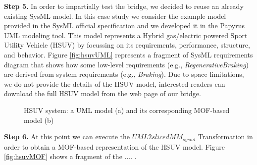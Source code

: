 \textbf{Step 5.} In order to impartially test the bridge, we decided to reuse an already existing SysML model. 
In this case study we consider the example model provided in the SysML official specification and we developed it in the Papyrus UML modeling tool.
This model represents a Hybrid gas/electric powered Sport Utility Vehicle (HSUV) by focussing on its requirements, performance, structure, and behavior. Figure \ref{fig:hsuvUML} represents a fragment of SysML requirements diagram that shows how some low-level requirements
(e.g., \textit{RegenerativeBraking})
are derived from system requirements (e.g., \textit{Braking}). Due to space limitations, we do not provide the details of the HSUV model, interested readers can download the full HSUV model from the web page of our bridge. 

\begin{figure}
  \centering
 \hspace{2mm}
  \caption{HSUV system: a UML model (a) and its corresponding MOF-based model (b)}
  \label{fig:hsuv}
\end{figure}
%
\textbf{Step 6.} At this point we can execute the $UML2slicedMM_{sysml}$ Transformation in order to obtain a MOF-based representation
of the HSUV model. Figure \ref{fig:hsuvMOF} shows a fragment of the .... .

